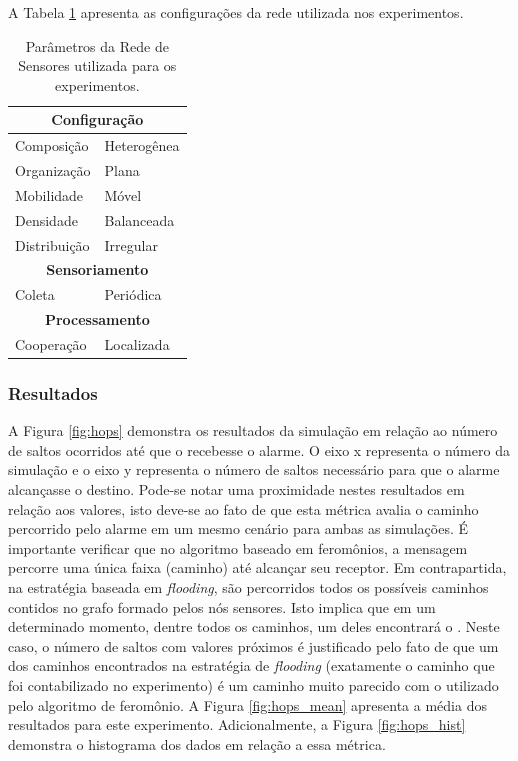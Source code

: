 A Tabela \ref{tbl:setup_network} apresenta as configurações da rede utilizada nos experimentos.
\begin{table}[h!]
\centering
	\begin{tabular}{| p{10cm} | l |}
		\hline
		\multicolumn{2}{|c|}{\textbf{Configuração}} \\
		\hline
		Composição  & Heterogênea\\
		\hline
		Organização & Plana\\
		\hline
		Mobilidade & Móvel  \\
		\hline
		Densidade & Balanceada  \\
		\hline
		Distribuição & Irregular \\
		\hline
		
		\hline
		\multicolumn{2}{|c|}{\textbf{Sensoriamento}} \\
		\hline
		Coleta  & Periódica\\
		\hline
		
		
		\hline
		\multicolumn{2}{|c|}{\textbf{Processamento}} \\
		\hline
		Cooperação  & Localizada\\
		\hline
		
	\end{tabular}

	\caption{Parâmetros da Rede de Sensores utilizada para os experimentos.}
	\label{tbl:setup_network}
\end{table}


\subsubsection{Resultados}

 A Figura \ref{fig:hops} demonstra os resultados da simulação em relação ao número de saltos ocorridos até que o \vant recebesse o alarme. O eixo x representa o número da simulação e o eixo y representa o número de saltos necessário para que o alarme alcançasse o destino. Pode-se notar uma proximidade nestes resultados em relação aos valores, isto deve-se ao fato de que esta métrica avalia o caminho percorrido pelo alarme em um mesmo cenário para ambas as simulações. É importante verificar que no algoritmo baseado em feromônios, a mensagem percorre uma única faixa (caminho) até alcançar seu receptor. Em contrapartida, na estratégia baseada em \emph{flooding}, são percorridos todos os possíveis caminhos contidos no grafo formado pelos nós sensores. Isto implica que em um determinado momento, dentre todos os caminhos, um deles encontrará o \vant. Neste caso, o número de saltos com valores próximos é justificado pelo fato de que um dos caminhos encontrados na estratégia de \emph{flooding} (exatamente o caminho que foi contabilizado no experimento) é um caminho muito parecido com o utilizado pelo algoritmo de feromônio. A Figura \ref{fig:hops_mean} apresenta a média dos resultados para este experimento. Adicionalmente, a Figura \ref{fig:hops_hist} demonstra o histograma dos dados em relação a essa métrica.


